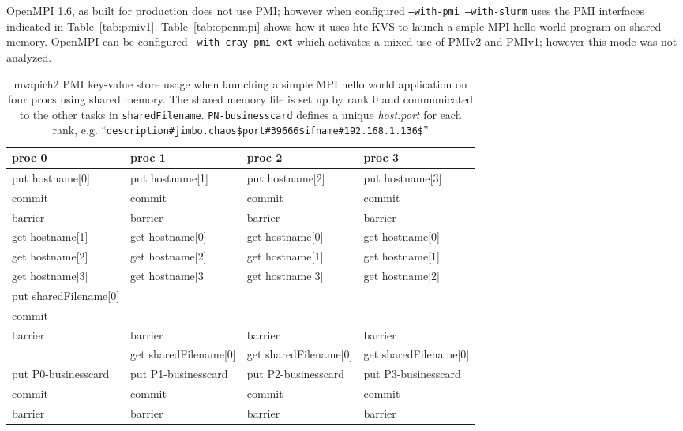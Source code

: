 OpenMPI 1.6, as built for production does not use PMI;
however when configured {\tt --with-pmi --with-slurm} uses the 
PMI interfaces indicated in Table~\ref{tab:pmiv1}.
Table~\ref{tab:openmpi} shows how it uses hte KVS to launch a smple MPI
hello world program on shared memory.
OpenMPI can be configured {\tt --with-cray-pmi-ext} which
activates a mixed use of PMIv2 and PMIv1; however this mode was not analyzed.

\begin{table}
\centering
\begin{tabular}{|p{4cm}|p{4cm}|p{4cm}|p{4cm}|}\hline
\textbf{proc 0} &       \textbf{proc 1} &   \textbf{proc 2} &    \textbf{proc 3}\\
\hline
put hostname[0] &     put hostname[1] &     put hostname[2] &     put hostname[3]\\
commit &              commit &              commit  &             commit\\
barrier &             barrier &             barrier &             barrier\\
\hline
get hostname[1] &     get hostname[0] &     get hostname[0] &     get hostname[0]\\
get hostname[2] &     get hostname[2] &     get hostname[1] &     get hostname[1]\\
get hostname[3] &     get hostname[3] &     get hostname[3] &     get hostname[2]\\
put sharedFilename[0] & & & \\
commit  & & &\\
barrier& barrier & barrier & barrier\\
\hline
 &                     get sharedFilename[0]&get sharedFilename[0]&get sharedFilename[0]\\
put P0-businesscard & put P1-businesscard & put P2-businesscard & put P3-businesscard\\
commit &              commit &              commit &              commit\\
barrier &             barrier &             barrier &             barrier\\
\hline
\end{tabular}
\caption{mvapich2 PMI key-value store usage when launching a simple 
MPI hello world application on four procs using shared memory.
The shared memory file
is set up by rank 0 and communicated to the other tasks in {\tt sharedFilename}.
{\tt PN-businesscard} defines a unique {\em host:port} for each rank, e.g.
``{\tt description\#jimbo.chaos\$port\#39666\$ifname\#192.168.1.136\$}''}
\label{tab:mvapich}
\end{table}

